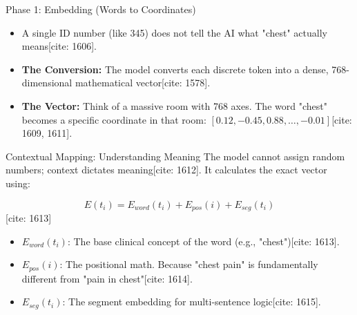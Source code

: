 \documentclass[10pt]{beamer}
\begin{document}
	\begin{frame}{Phase 1: Embedding (Words to Coordinates)}
		\begin{center}
		\end{center}
		
		\begin{itemize}
			\item A single ID number (like 345) does not tell the AI what "chest" actually means[cite: 1606].
			\item \textbf{The Conversion:} The model converts each discrete token into a dense, 768-dimensional mathematical vector[cite: 1578].
			\item \textbf{The Vector:} Think of a massive room with 768 axes. The word "chest" becomes a specific coordinate in that room: $[0.12, -0.45, 0.88, \dots, -0.01]$[cite: 1609, 1611].
		\end{itemize}
	\end{frame}
	
	\begin{frame}{Contextual Mapping: Understanding Meaning}
		The model cannot assign random numbers; context dictates meaning[cite: 1612]. It calculates the exact vector using:
		
		$$E(t_{i}) = E_{word}(t_{i}) + E_{pos}(i) + E_{seg}(t_{i})$$ [cite: 1613]
		
		\begin{itemize}
			\item $E_{word}(t_{i})$: The base clinical concept of the word (e.g., "chest")[cite: 1613].
			\item $E_{pos}(i)$: The positional math. Because "chest pain" is fundamentally different from "pain in chest"[cite: 1614].
			\item $E_{seg}(t_{i})$: The segment embedding for multi-sentence logic[cite: 1615].
		\end{itemize}
	\end{frame}
	
\end{document}
